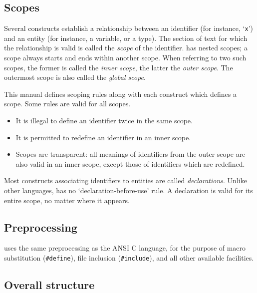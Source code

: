 \subsection{Scopes\label{scope}}

Several \todaysname{} constructs establish a relationship between an
identifier (for instance, `\verb.x.') and an entity (for instance, a
variable, or a type).  The section of text for which the relationship
is valid is called the {\em scope} of the identifier.  \todaysname{}
has nested scopes; a scope always starts and ends within another
scope.  When referring to two such scopes, the former is called the
{\em inner scope}, the latter the {\em outer scope}.  The outermost
scope is also called the {\em global scope}.

This manual defines scoping rules along with each construct which
defines a scope.  Some rules are valid for all scopes.

\begin{itemize}
\item It is illegal to define an identifier twice in the
same scope. \item It is permitted to redefine an identifier in an inner
scope.  \item Scopes are transparent: all meanings of identifiers from the
outer scope are also valid in an inner scope, except those of
identifiers which are redefined.
\end{itemize}
%
Most constructs associating identifiers to entities are called {\em
declarations}.  Unlike other languages, \todaysname{} has no
`declaration-before-use' rule.  A declaration is valid for its entire
scope, no matter where it appears.

\subsection{Preprocessing}

\todaysname{} uses the same preprocessing as the ANSI C language, for
the purpose of macro substitution (\verb.#define.), file inclusion
(\verb.#include.), and all other available facilities.

\subsection{Overall structure}

